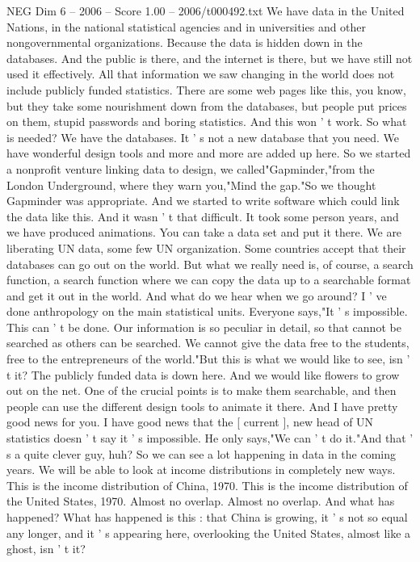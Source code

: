 \begin{textsample}{NEG Dim 6 – 2006 – Score 1.00 – 2006/t000492.txt}
We have data in the United Nations, in the national statistical agencies and in universities and other nongovernmental organizations.
Because the data is hidden down in the databases.
And the public is there, and the internet is there, but we have still not used it effectively.
All that information we saw changing in the world does not include publicly funded statistics.
There are some web pages like this, you know, but they take some nourishment down from the databases, but people put prices on them, stupid passwords and boring statistics.
And this won ' t work.
So what is needed?
We have the databases.
It ' s not a new database that you need.
We have wonderful design tools and more and more are added up here.
So we started a nonprofit venture linking data to design, we called"Gapminder,"from the London Underground, where they warn you,"Mind the gap."So we thought Gapminder was appropriate.
And we started to write software which could link the data like this.
And it wasn ' t that difficult.
It took some person years, and we have produced animations.
You can take a data set and put it there.
We are liberating UN data, some few UN organization.
Some countries accept that their databases can go out on the world.
But what we really need is, of course, a search function, a search function where we can copy the data up to a searchable format and get it out in the world.
And what do we hear when we go around?
I ' ve done anthropology on the main statistical units.
Everyone says,"It ' s impossible.
This can ' t be done.
Our information is so peculiar in detail, so that cannot be searched as others can be searched.
We cannot give the data free to the students, free to the entrepreneurs of the world."But this is what we would like to see, isn ' t it?
The publicly funded data is down here.
And we would like flowers to grow out on the net.
One of the crucial points is to make them searchable, and then people can use the different design tools to animate it there.
And I have pretty good news for you.
I have good news that the [ current ], new head of UN statistics doesn ' t say it ' s impossible.
He only says,"We can ' t do it."And that ' s a quite clever guy, huh?
So we can see a lot happening in data in the coming years.
We will be able to look at income distributions in completely new ways.
This is the income distribution of China, 1970.
This is the income distribution of the United States, 1970.
Almost no overlap.
Almost no overlap.
And what has happened?
What has happened is this : that China is growing, it ' s not so equal any longer, and it ' s appearing here, overlooking the United States, almost like a ghost, isn ' t it?

\end{textsample}
